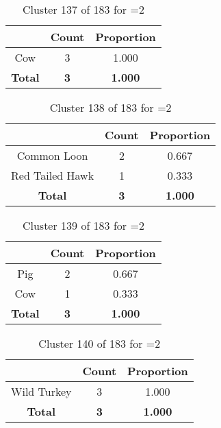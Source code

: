 \begin{table}[ht!]
\centering
\begin{tabular}{|c|c|c|}
\hline
\bf \Spec{} &\bf Count &\bf Proportion\\ \hline \hline
Cow & 3 & 1.000\\ \hline
\hline
\bf Total & \bf 3 & \bf 1.000\\ \hline
\end{tabular}
\label{tab:cluster:137:2}
\caption{Cluster 137 of 183 for \minneigh{}=2}
\end{table}

\begin{table}[ht!]
\centering
\begin{tabular}{|c|c|c|}
\hline
\bf \Spec{} &\bf Count &\bf Proportion\\ \hline \hline
Common Loon & 2 & 0.667\\ \hline
Red Tailed Hawk & 1 & 0.333\\ \hline
\hline
\bf Total & \bf 3 & \bf 1.000\\ \hline
\end{tabular}
\label{tab:cluster:138:2}
\caption{Cluster 138 of 183 for \minneigh{}=2}
\end{table}

\begin{table}[ht!]
\centering
\begin{tabular}{|c|c|c|}
\hline
\bf \Spec{} &\bf Count &\bf Proportion\\ \hline \hline
Pig & 2 & 0.667\\ \hline
Cow & 1 & 0.333\\ \hline
\hline
\bf Total & \bf 3 & \bf 1.000\\ \hline
\end{tabular}
\label{tab:cluster:139:2}
\caption{Cluster 139 of 183 for \minneigh{}=2}
\end{table}

\clearpage
\begin{table}[ht!]
\centering
\begin{tabular}{|c|c|c|}
\hline
\bf \Spec{} &\bf Count &\bf Proportion\\ \hline \hline
Wild Turkey & 3 & 1.000\\ \hline
\hline
\bf Total & \bf 3 & \bf 1.000\\ \hline
\end{tabular}
\label{tab:cluster:140:2}
\caption{Cluster 140 of 183 for \minneigh{}=2}
\end{table}

